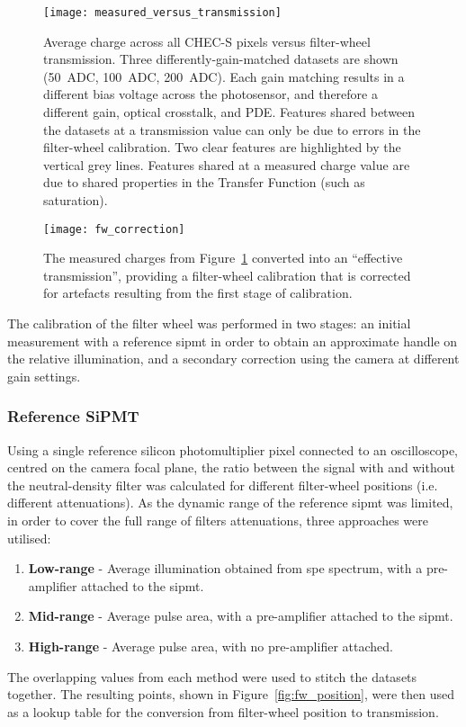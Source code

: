 \begin{figure}
	\centering
    \texttt{[image: measured\_versus\_transmission]} 
	\caption[Measured charge versus transmission]{Average charge across all CHEC-S pixels versus filter-wheel transmission. Three differently-gain-matched datasets are shown (50~ADC, 100~ADC, 200~ADC). Each gain matching results in a different bias voltage across the photosensor, and therefore a different gain, optical crosstalk, and PDE. Features shared between the datasets at a transmission value can only be due to errors in the filter-wheel calibration. Two clear features are highlighted by the vertical grey lines. Features shared at a measured charge value are due to shared properties in the Transfer Function (such as saturation).}
	\label{fig:measured_versus_transmission}
\end{figure}

\begin{figure}
	\centering
    \texttt{[image: fw\_correction]} 
	\caption[Secondary filter-wheel calibration]{The measured charges from Figure~\ref{fig:measured_versus_transmission} converted into an ``effective transmission'', providing a filter-wheel calibration that is corrected for artefacts resulting from the first stage of calibration.}
	\label{fig:fw_correction}
\end{figure}

The calibration of the filter wheel was performed in two stages: an initial measurement with a reference \gls{sipmt} in order to obtain an approximate handle on the relative illumination, and a secondary correction using the camera at different gain settings.

\subsubsection{Reference SiPMT}

Using a single reference silicon photomultiplier pixel connected to an oscilloscope, centred on the camera focal plane, the ratio between the signal with and without the neutral-density filter was calculated for different filter-wheel positions (i.e. different attenuations). As the dynamic range of the reference \gls{sipmt} was limited, in order to cover the full range of filters attenuations, three approaches were utilised:
\begin{enumerate}
\item \textbf{Low-range} - Average illumination obtained from \gls{spe} spectrum, with a pre-amplifier attached to the \gls{sipmt}.
\item \textbf{Mid-range} - Average pulse area, with a pre-amplifier attached to the \gls{sipmt}.
\item \textbf{High-range} - Average pulse area, with no pre-amplifier attached.
\end{enumerate}
The overlapping values from each method were used to stitch the datasets together. The resulting points, shown in Figure~\ref{fig:fw_position}, were then used as a lookup table for the conversion from filter-wheel position to transmission.

